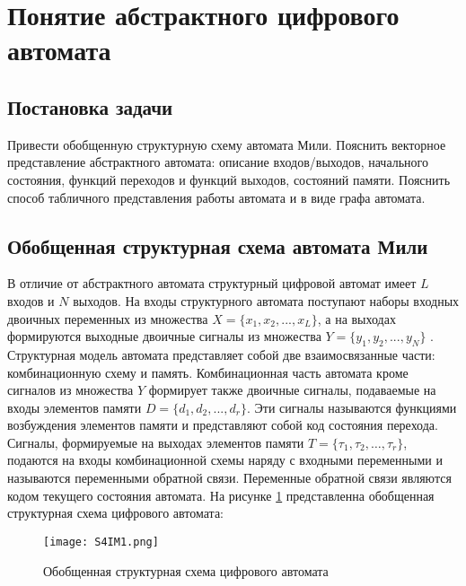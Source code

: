 \section{Понятие абстрактного цифрового автомата}

\subsection{Постановка задачи}



Привести обобщенную структурную схему автомата Мили. Пояснить векторное представление абстрактного автомата: описание входов/выходов, начального состояния, функций переходов и функций выходов, состояний памяти. Пояснить способ табличного представления работы автомата и в виде графа автомата.

\subsection{Обобщенная структурная схема автомата Мили}

В отличие от абстрактного автомата структурный цифровой автомат имеет $L$ входов и $N$ выходов. На входы структурного автомата поступают наборы входных двоичных переменных из множества $X = \lbrace x_1,x_2,...,x_L \rbrace$, а на выходах формируются выходные двоичные сигналы из множества $Y= \lbrace y_1,y_2,...,y_N \rbrace$ . Структурная модель автомата представляет собой две взаимосвязанные части: комбинационную схему и память. Комбинационная часть автомата кроме сигналов из множества $Y$ формирует также двоичные сигналы, подаваемые на входы элементов памяти $D=\lbrace d_1,d_2,...,d_r \rbrace$. Эти сигналы называются функциями возбуждения элементов памяти и представляют собой код состояния перехода. Сигналы, формируемые на выходах элементов памяти $T =\lbrace \tau_1, \tau_2, …, \tau_r\rbrace$, подаются на входы комбинационной схемы наряду с входными переменными и называются переменными обратной связи. Переменные обратной связи являются кодом текущего состояния автомата. На рисунке \ref{fig:section4:generalizedSchemeDifitalMachine} представленна обобщенная структурная схема цифрового автомата:

\begin{figure}[ht!]
    \centering
    \texttt{[image: S4IM1.png]}
    \caption{Обобщенная структурная схема цифрового автомата}
    \label{fig:section4:generalizedSchemeDifitalMachine}
\end{figure}

